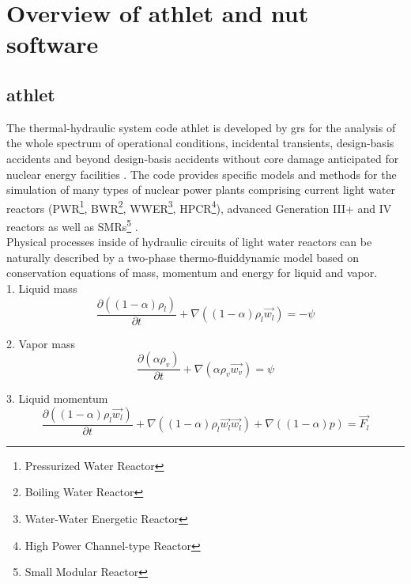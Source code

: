 \chapter{Overview of \acrshort{athlet} and \acrshort{nut} software}\label{chapter:athlet-nut}

\section{\acrshort{athlet}}
\label{sec:athlet-overview}


The thermal-hydraulic system code \acrshort{athlet} is developed by \acrshort{grs} for the analysis of the whole spectrum of operational conditions, incidental transients, design-basis accidents and beyond design-basis accidents without core damage anticipated for nuclear energy facilities \cite{grs:athlet-info}. The code provides specific models and methods for the simulation of many types of nuclear power plants comprising current light water reactors (PWR\footnote{Pressurized Water Reactor}, BWR\footnote{Boiling Water Reactor}, WWER\footnote{Water-Water Energetic Reactor}, HPCR\footnote{High Power Channel-type Reactor}), advanced Generation III+ and IV reactors as well as SMRs\footnote{Small Modular Reactor} \cite{grs:athlet-info}.\\


Physical processes inside of hydraulic circuits of light water reactors can be naturally described by a two-phase thermo-fluiddynamic model based on conservation equations of mass, momentum and energy for liquid and vapor.\\

1. Liquid mass
\begin{equation} \label{eq:athlet-1}
\frac{\partial ((1-\alpha)\rho_{l})}{\partial t} + \nabla ((1-\alpha) \rho_{l} \vec{w_{l}}) = - \psi
\end{equation}


2. Vapor mass
\begin{equation} \label{eq:athlet-2}
\frac{\partial (\alpha \rho_{v})}{\partial t} + \nabla (\alpha \rho_{v} \vec{w_{v}}) = \psi
\end{equation}


3. Liquid momentum
\begin{equation} \label{eq:athlet-3}
\frac{\partial ((1-\alpha) \rho_{l} \vec{w_{l}})}{\partial t} + \nabla ((1-\alpha) \rho_{l} \vec{w_{l}} \vec{w_{l}}) + \nabla ((1 - \alpha)p) = \vec{F_{l}}
\end{equation}


